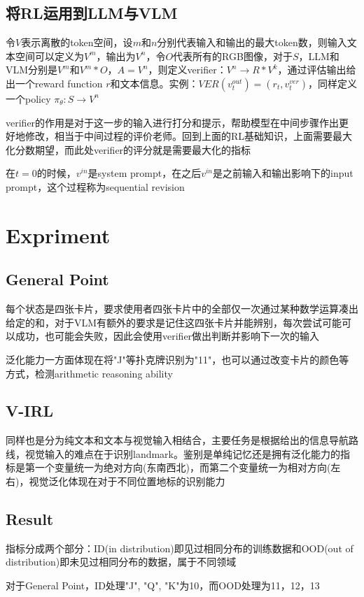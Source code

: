 \documentclass[a4paper,12pt]{article}
\begin{document}
\subsection{将RL运用到LLM与VLM}
令$V$表示离散的token空间，设$m$和$n$分别代表输入和输出的最大token数，则输入文本空间可以定义为$V^m$，输出为$V^n$，令$O$代表所有的RGB图像，对于$S$，LLM和VLM分别是$V^m$和$V^m*O$，$A = V^n$，则定义verifier：$V^n \to R*V^k$，通过评估输出给出一个reward function $r$和文本信息。实例：$VER(v_t^{out}) = (r_t, v_t^{ver})$，同样定义一个policy $\pi_{\theta}: S \to V^n$

verifier的作用是对于这一步的输入进行打分和提示，帮助模型在中间步骤作出更好地修改，相当于中间过程的评价老师。回到上面的RL基础知识，上面需要最大化分数期望，而此处verifier的评分就是需要最大化的指标

在$t=0$的时候，$v^{in}$是system prompt，在之后$v^{in}$是之前输入和输出影响下的input prompt，这个过程称为sequential revision

\section{Expriment}
\subsection{General Point}
每个状态是四张卡片，要求使用者四张卡片中的全部仅一次通过某种数学运算凑出给定的和，对于VLM有额外的要求是记住这四张卡片并能辨别，每次尝试可能可以成功，也可能会失败，因此会使用verifier做出判断并影响下一次的输入

泛化能力一方面体现在将"J"等扑克牌识别为"11"，也可以通过改变卡片的颜色等方式，检测arithmetic reasoning ability

\subsection{V-IRL}
同样也是分为纯文本和文本与视觉输入相结合，主要任务是根据给出的信息导航路线，视觉输入的难点在于识别landmark。鉴别是单纯记忆还是拥有泛化能力的指标是第一个变量统一为绝对方向(东南西北)，而第二个变量统一为相对方向(左右)，视觉泛化体现在对于不同位置地标的识别能力

\subsection{Result}
指标分成两个部分：ID(in distribution)即见过相同分布的训练数据和OOD(out of distribution)即未见过相同分布的数据，属于不同领域

对于General Point，ID处理"J", "Q", "K"为10，而OOD处理为11，12，13
\end{document}
